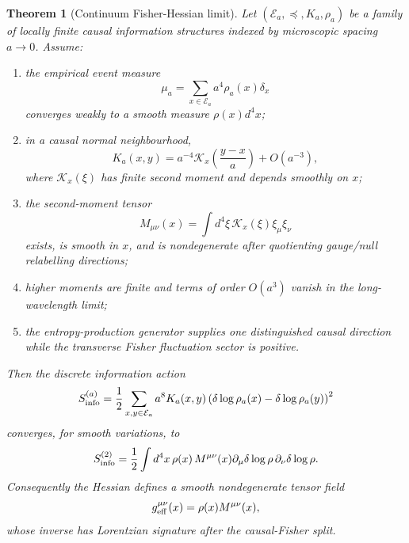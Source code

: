 \documentclass[11pt]{article}
\newtheorem{theorem}[definition]{Theorem}
\begin{document}
\begin{theorem}[Continuum Fisher-Hessian limit]
Let $(\mathcal E_a,\preceq,K_a,\rho_a)$ be a family of locally finite causal information structures indexed by microscopic spacing $a\to0$. Assume:
\begin{enumerate}[label=(\roman*)]
\item the empirical event measure
\[
\mu_a=\sum_{x\in\mathcal E_a} a^4\rho_a(x)\delta_x
\]
converges weakly to a smooth measure $\rho(x)d^4x$;

\item in a causal normal neighbourhood,
\[
K_a(x,y)=a^{-4}\mathcal K_x\!\left(\frac{y-x}{a}\right)+O(a^{-3}),
\]
where $\mathcal K_x(\xi)$ has finite second moment and depends smoothly on $x$;

\item the second-moment tensor
\[
M_{\mu\nu}(x)=\int d^4\xi\,\mathcal K_x(\xi)\xi_\mu\xi_\nu
\]
exists, is smooth in $x$, and is nondegenerate after quotienting gauge/null relabelling directions;

\item higher moments are finite and terms of order $O(a^3)$ vanish in the long-wavelength limit;

\item the entropy-production generator supplies one distinguished causal direction while the transverse Fisher fluctuation sector is positive.
\end{enumerate}

Then the discrete information action
\[
S_{\rm info}^{(a)}
=
\frac12
\sum_{x,y\in\mathcal E_a}
a^8K_a(x,y)
\left(
\delta\log\rho_a(x)-\delta\log\rho_a(y)
\right)^2
\]
converges, for smooth variations, to
\[
S_{\rm info}^{(2)}
=
\frac12
\int d^4x\,\rho(x)\,
M^{\mu\nu}(x)
\partial_\mu\delta\log\rho\,
\partial_\nu\delta\log\rho.
\]
Consequently the Hessian defines a smooth nondegenerate tensor field
\[
g_{\rm eff}^{\mu\nu}(x)=\rho(x)M^{\mu\nu}(x),
\]
whose inverse has Lorentzian signature after the causal-Fisher split.
\end{theorem}
\end{document}
